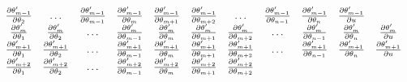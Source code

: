 \begin{linenomath}
\begin{equation}
\begin{split}
\begin{array}{ccccccccccc}
        \frac{\partial \parameter[m-1]\proposed}{\partial \parameter[2]} &
        \ldots &
        \frac{\partial \parameter[m-1]\proposed}{\partial \parameter[m-1]} &
        \frac{\partial \parameter[m-1]\proposed}{\partial \parameter[m]} &
        \frac{\partial \parameter[m-1]\proposed}{\partial \parameter[m+1]} &
        \frac{\partial \parameter[m-1]\proposed}{\partial \parameter[m+2]} &
        \ldots &
        \frac{\partial \parameter[m-1]\proposed}{\partial \parameter[n-1]} &
        \frac{\partial \parameter[m-1]\proposed}{\partial \parameter[n]} &
        \frac{\partial \parameter[m-1]\proposed}{\partial \uniformdeviate} \\
        \frac{\partial \parameter[m]\proposed}{\partial \parameter[1]} &
        \frac{\partial \parameter[m]\proposed}{\partial \parameter[2]} &
        \ldots &
        \frac{\partial \parameter[m]\proposed}{\partial \parameter[m-1]} &
        \frac{\partial \parameter[m]\proposed}{\partial \parameter[m]} &
        \frac{\partial \parameter[m]\proposed}{\partial \parameter[m+1]} &
        \frac{\partial \parameter[m]\proposed}{\partial \parameter[m+2]} &
        \ldots &
        \frac{\partial \parameter[m]\proposed}{\partial \parameter[n-1]} &
        \frac{\partial \parameter[m]\proposed}{\partial \parameter[n]} &
        \frac{\partial \parameter[m]\proposed}{\partial \uniformdeviate} \\
        \frac{\partial \parameter[m+1]\proposed}{\partial \parameter[1]} &
        \frac{\partial \parameter[m+1]\proposed}{\partial \parameter[2]} &
        \ldots &
        \frac{\partial \parameter[m+1]\proposed}{\partial \parameter[m-1]} &
        \frac{\partial \parameter[m+1]\proposed}{\partial \parameter[m]} &
        \frac{\partial \parameter[m+1]\proposed}{\partial \parameter[m+1]} &
        \frac{\partial \parameter[m+1]\proposed}{\partial \parameter[m+2]} &
        \ldots &
        \frac{\partial \parameter[m+1]\proposed}{\partial \parameter[n-1]} &
        \frac{\partial \parameter[m+1]\proposed}{\partial \parameter[n]} &
        \frac{\partial \parameter[m+1]\proposed}{\partial \uniformdeviate} \\
        \frac{\partial \parameter[m+2]\proposed}{\partial \parameter[1]} &
        \frac{\partial \parameter[m+2]\proposed}{\partial \parameter[2]} &
        \ldots &
        \frac{\partial \parameter[m+2]\proposed}{\partial \parameter[m-1]} &
        \frac{\partial \parameter[m+2]\proposed}{\partial \parameter[m]} &
        \frac{\partial \parameter[m+2]\proposed}{\partial \parameter[m+1]} &
        \frac{\partial \parameter[m+2]\proposed}{\partial \parameter[m+2]} &

\end{array}
\end{split}
\end{equation}
\end{linenomath}
